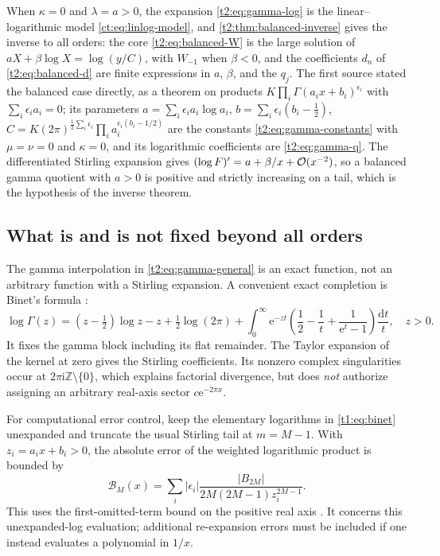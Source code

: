 \documentclass[11pt,openany]{book}
\numberwithin{equation}{chapter}
\theoremstyle{plain}
\theoremstyle{definition}
\theoremstyle{remark}
\newcommand{\ee}{\mathrm e}
\newcommand{\ii}{\mathrm i}
\newcommand{\ddn}{\mathrm d}                  %
\begin{document}
When $\kappa=0$ and $\lambda=a>0$, the expansion \cref{t2:eq:gamma-log} is
the linear--logarithmic model \cref{ct:eq:linlog-model}, and
\cref{t2:thm:balanced-inverse} gives the inverse to all orders: the core
\cref{t2:eq:balanced-W} is the large solution of $aX+\beta\log X=\log(y/C)$,
with $W_{-1}$ when $\beta<0$, and the coefficients $d_n$ of
\cref{t2:eq:balanced-d} are finite expressions in $a$, $\beta$, and the
$q_j$.  The first source stated the balanced case directly, as a theorem on
products $K\prod_i\Gamma(a_ix+b_i)^{\epsilon_i}$ with $\sum_i\epsilon_ia_i=0$;
its parameters $a=\sum_i\epsilon_ia_i\log a_i$,
$b=\sum_i\epsilon_i(b_i-\tfrac12)$,
$C=K(2\pi)^{\frac12\sum_i\epsilon_i}\prod_ia_i^{\epsilon_i(b_i-1/2)}$ are the
constants \cref{t2:eq:gamma-constants} with $\mu=\nu=0$ and $\kappa=0$, and
its logarithmic coefficients are \cref{t2:eq:gamma-q}.  The differentiated
Stirling expansion gives $(\log F)'=a+\beta/x+\mathcal O(x^{-2})$, so a balanced
gamma quotient with $a>0$ is positive and strictly increasing on a tail,
which is the hypothesis of the inverse theorem.

\subsection{What is and is not fixed beyond all orders}
\label{t1:subsec:binet}
The gamma interpolation in \eqref{t2:eq:gamma-general} is an exact function, not an arbitrary function with a Stirling expansion. A convenient exact completion is Binet's formula \cite{dlmfbinet}:
\begin{equation}
 \log\Gamma(z)=(z-\tfrac12)\log z-z+\tfrac12\log(2\pi)
 +\int_0^\infty\ee^{-zt}
 \left(\frac12-\frac1t+\frac1{\ee^t-1}\right)\frac{\ddn t}{t},
 \quad z>0.
 \label{t1:eq:binet}
\end{equation}
It fixes the gamma block including its flat remainder. The Taylor expansion of the kernel at zero gives the Stirling coefficients. Its nonzero complex singularities occur at $2\pi\ii\mathbb Z\setminus\{0\}$, which explains factorial divergence, but does \emph{not} authorize assigning an arbitrary real-axis sector $c\ee^{-2\pi x}$.

For computational error control, keep the elementary logarithms in \eqref{t1:eq:binet} unexpanded and truncate the usual Stirling tail at $m=M-1$. With $z_i=a_ix+b_i>0$, the absolute error of the weighted logarithmic product is bounded by
\begin{equation}
 \mathcal B_M(x)=\sum_i|\epsilon_i|
 \frac{|B_{2M}|}{2M(2M-1)z_i^{2M-1}}.
 \label{t1:eq:binetbound}
\end{equation}
This uses the first-omitted-term bound on the positive real axis \cite{dlmfgamma}. It concerns this unexpanded-log evaluation; additional re-expansion errors must be included if one instead evaluates a polynomial in $1/x$.
\end{document}
